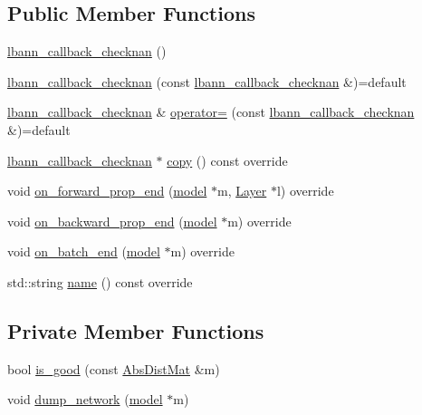 \subsection*{Public Member Functions}
\begin{DoxyCompactItemize}
\item 
\hyperlink{classlbann_1_1lbann__callback__checknan_a62c093e4f67a4b387dee11fe41b5ec2f}{lbann\+\_\+callback\+\_\+checknan} ()
\item 
\hyperlink{classlbann_1_1lbann__callback__checknan_a72103639c77ba3612ae174d36b279fe5}{lbann\+\_\+callback\+\_\+checknan} (const \hyperlink{classlbann_1_1lbann__callback__checknan}{lbann\+\_\+callback\+\_\+checknan} \&)=default
\item 
\hyperlink{classlbann_1_1lbann__callback__checknan}{lbann\+\_\+callback\+\_\+checknan} \& \hyperlink{classlbann_1_1lbann__callback__checknan_a93b6c22d9fa21a77b91572b6e1c7c3d1}{operator=} (const \hyperlink{classlbann_1_1lbann__callback__checknan}{lbann\+\_\+callback\+\_\+checknan} \&)=default
\item 
\hyperlink{classlbann_1_1lbann__callback__checknan}{lbann\+\_\+callback\+\_\+checknan} $\ast$ \hyperlink{classlbann_1_1lbann__callback__checknan_ad7156df3cd81c493584ebd4a0c9d96b4}{copy} () const override
\item 
void \hyperlink{classlbann_1_1lbann__callback__checknan_a09388ae76566a6a93c957ab76cd54dcd}{on\+\_\+forward\+\_\+prop\+\_\+end} (\hyperlink{classlbann_1_1model}{model} $\ast$m, \hyperlink{classlbann_1_1Layer}{Layer} $\ast$l) override
\item 
void \hyperlink{classlbann_1_1lbann__callback__checknan_a40d9a9fcc5849746570b99321e1c5488}{on\+\_\+backward\+\_\+prop\+\_\+end} (\hyperlink{classlbann_1_1model}{model} $\ast$m) override
\item 
void \hyperlink{classlbann_1_1lbann__callback__checknan_a1d1b3b082aa49016e7b80e0f267575da}{on\+\_\+batch\+\_\+end} (\hyperlink{classlbann_1_1model}{model} $\ast$m) override
\item 
std\+::string \hyperlink{classlbann_1_1lbann__callback__checknan_ab42c997a06058c3535792408fdd5fed8}{name} () const override
\end{DoxyCompactItemize}
\subsection*{Private Member Functions}
\begin{DoxyCompactItemize}
\item 
bool \hyperlink{classlbann_1_1lbann__callback__checknan_ac74f7f665823d0500875b9740aaccabc}{is\+\_\+good} (const \hyperlink{base_8hpp_a9a697a504ae84010e7439ffec862b470}{Abs\+Dist\+Mat} \&m)
\item 
void \hyperlink{classlbann_1_1lbann__callback__checknan_a335713a3df9194f657f98cccd2f695f5}{dump\+\_\+network} (\hyperlink{classlbann_1_1model}{model} $\ast$m)
\end{DoxyCompactItemize}
